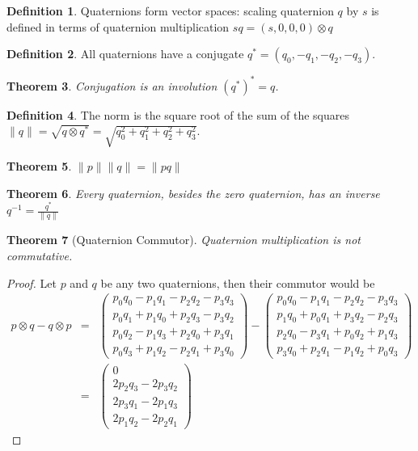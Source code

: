 \documentclass{amsart}
\newtheorem{theorem}{Theorem}[section]
\theoremstyle{definition}
\newtheorem{definition}[theorem]{Definition}
\theoremstyle{remark}
\numberwithin{equation}{section}
\begin{document}
\begin{definition}
  Quaternions form vector spaces: scaling quaternion $q$ by $s$ is defined in terms of quaternion multiplication $sq = (s,0,0,0)\otimes q$
\end{definition}

\begin{definition}
  All quaternions have a conjugate $q^*=(q_0,-q_1,-q_2,-q_3)$. 
\end{definition}

\begin{theorem}
  Conjugation is an involution $(q^*)^*=q$.
\end{theorem}

\begin{definition}
  The norm is the square root of the sum of the squares $\|q\|=\sqrt{q\otimes q^*}=\sqrt{q_0^2+q_1^2+q_2^2+q_3^2}$.
\end{definition}

\begin{theorem}
  $\|p\|\|q\|=\|pq\|$
\end{theorem}

\begin{theorem}
  Every quaternion, besides the zero quaternion, has an inverse $q^{-1}=\frac{q^*}{\|q\|}$
\end{theorem}

\begin{theorem}[Quaternion Commutor]
  Quaternion multiplication is not commutative.
\end{theorem}
\begin{proof}
  Let $p$ and $q$ be any two quaternions, then their commutor would be
  \begin{eqnarray}
    p\otimes q-q\otimes p &=&
    \begin{pmatrix}
      p_0q_0 - p_1q_1 - p_2q_2 - p_3q_3 \\
      p_0q_1 + p_1q_0 + p_2q_3 - p_3q_2 \\
      p_0q_2 - p_1q_3 + p_2q_0 + p_3q_1 \\
      p_0q_3 + p_1q_2 - p_2q_1 + p_3q_0
    \end{pmatrix} -
    \begin{pmatrix}
      p_0q_0 - p_1q_1 - p_2q_2 - p_3q_3 \\
      p_1q_0 + p_0q_1 + p_3q_2 - p_2q_3 \\
      p_2q_0 - p_3q_1 + p_0q_2 + p_1q_3 \\
      p_3q_0 + p_2q_1 - p_1q_2 + p_0q_3
    \end{pmatrix}\nonumber\\
    &=&
    \begin{pmatrix}
      0 \\
      2p_2q_3-2p_3q_2\\
      2p_3q_1-2p_1q_3\\
      2p_1q_2-2p_2q_1
    \end{pmatrix}
  \end{eqnarray}
\end{proof}
\end{document}
